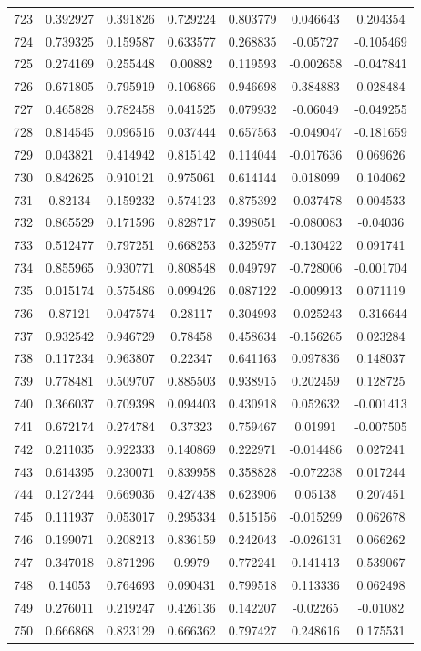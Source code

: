 \begin{table}
\begin{tabular}{c|c|c|c|c|c|c}
723 & 0.392927 & 0.391826 & 0.729224 & 0.803779 & 0.046643 & 0.204354\\
724 & 0.739325 & 0.159587 & 0.633577 & 0.268835 & -0.05727 & -0.105469\\
725 & 0.274169 & 0.255448 & 0.00882 & 0.119593 & -0.002658 & -0.047841\\
726 & 0.671805 & 0.795919 & 0.106866 & 0.946698 & 0.384883 & 0.028484\\
727 & 0.465828 & 0.782458 & 0.041525 & 0.079932 & -0.06049 & -0.049255\\
728 & 0.814545 & 0.096516 & 0.037444 & 0.657563 & -0.049047 & -0.181659\\
729 & 0.043821 & 0.414942 & 0.815142 & 0.114044 & -0.017636 & 0.069626\\
730 & 0.842625 & 0.910121 & 0.975061 & 0.614144 & 0.018099 & 0.104062\\
731 & 0.82134 & 0.159232 & 0.574123 & 0.875392 & -0.037478 & 0.004533\\
732 & 0.865529 & 0.171596 & 0.828717 & 0.398051 & -0.080083 & -0.04036\\
733 & 0.512477 & 0.797251 & 0.668253 & 0.325977 & -0.130422 & 0.091741\\
734 & 0.855965 & 0.930771 & 0.808548 & 0.049797 & -0.728006 & -0.001704\\
735 & 0.015174 & 0.575486 & 0.099426 & 0.087122 & -0.009913 & 0.071119\\
736 & 0.87121 & 0.047574 & 0.28117 & 0.304993 & -0.025243 & -0.316644\\
737 & 0.932542 & 0.946729 & 0.78458 & 0.458634 & -0.156265 & 0.023284\\
738 & 0.117234 & 0.963807 & 0.22347 & 0.641163 & 0.097836 & 0.148037\\
739 & 0.778481 & 0.509707 & 0.885503 & 0.938915 & 0.202459 & 0.128725\\
740 & 0.366037 & 0.709398 & 0.094403 & 0.430918 & 0.052632 & -0.001413\\
741 & 0.672174 & 0.274784 & 0.37323 & 0.759467 & 0.01991 & -0.007505\\
742 & 0.211035 & 0.922333 & 0.140869 & 0.222971 & -0.014486 & 0.027241\\
743 & 0.614395 & 0.230071 & 0.839958 & 0.358828 & -0.072238 & 0.017244\\
744 & 0.127244 & 0.669036 & 0.427438 & 0.623906 & 0.05138 & 0.207451\\
745 & 0.111937 & 0.053017 & 0.295334 & 0.515156 & -0.015299 & 0.062678\\
746 & 0.199071 & 0.208213 & 0.836159 & 0.242043 & -0.026131 & 0.066262\\
747 & 0.347018 & 0.871296 & 0.9979 & 0.772241 & 0.141413 & 0.539067\\
748 & 0.14053 & 0.764693 & 0.090431 & 0.799518 & 0.113336 & 0.062498\\
749 & 0.276011 & 0.219247 & 0.426136 & 0.142207 & -0.02265 & -0.01082\\
750 & 0.666868 & 0.823129 & 0.666362 & 0.797427 & 0.248616 & 0.175531\\
\end{tabular}
\end{table}
